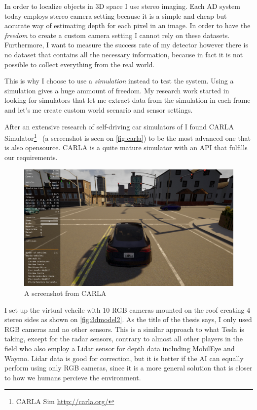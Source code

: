 In order to localize objects in 3D space I use stereo imaging. Each AD system
today employs stereo camera setting because it is a simple and cheap but
accurate way of estimating depth for each pixel in an image. In order to have
the \emph{freedom} to create a custom camera setting I cannot rely on these
datasets. Furthermore, I want to measure the success rate of my detector however
there is no dataset that contains all the necessary information, because in fact
it is not possible to collect everything from the real world.

This is why I choose to use a \emph{simulation} instead to test the system.
Using a simulation gives a huge ammount of freedom. My research work started
in looking for simulators that let me extract data from the simulation in each
frame and let's me create custom world scenario and sensor settings. 

After an extensive research of self-driving car simulators of I found CARLA
Simulator\footnote{CARLA Sim \url{http://carla.org/}}~\cite{Dosovitskiy17} (a
screenshot is seen on \autoref{fig:carla}) to be the most advanced one that is
also opensource. CARLA is a quite mature simulator with an API that
fulfills our requirements.

\begin{figure}[!ht]
    \centering
    \includegraphics[width=150mm, keepaspectratio]{figures/carla.png}
    \caption{A screenshot from CARLA}
    \label{fig:carla}
\end{figure}

I set up the virtual vehcile with 10 RGB cameras mounted on the roof creating 4
stereo sides as shown on \autoref{fig:3dmodel2}. As the title of the thesis
says, I only used RGB cameras and no other sensors. This is a similar approach
to what Tesla is taking, except for the radar sensors, contrary to almost all
other players in the field who also employ a Lidar sensor for depth data
including MobilEye and Waymo. Lidar data is good for correction, but it is
better if the AI can equally perform using only RGB cameras, since it is a more
general solution that is closer to how we humans percieve the environment.

